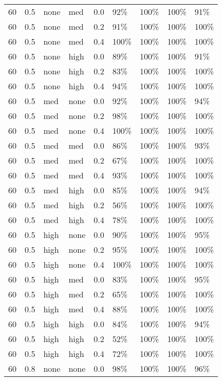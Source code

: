 \begin{longtable}{rrllrllll}
  60 & 0.5 & none & med & 0.0 & 92\% & 100\% & 100\% & 91\% \\ 
  60 & 0.5 & none & med & 0.2 & 91\% & 100\% & 100\% & 100\% \\ 
  60 & 0.5 & none & med & 0.4 & 100\% & 100\% & 100\% & 100\% \\ 
  60 & 0.5 & none & high & 0.0 & 89\% & 100\% & 100\% & 91\% \\ 
  60 & 0.5 & none & high & 0.2 & 83\% & 100\% & 100\% & 100\% \\ 
  60 & 0.5 & none & high & 0.4 & 94\% & 100\% & 100\% & 100\% \\ 
  60 & 0.5 & med & none & 0.0 & 92\% & 100\% & 100\% & 94\% \\ 
  60 & 0.5 & med & none & 0.2 & 98\% & 100\% & 100\% & 100\% \\ 
  60 & 0.5 & med & none & 0.4 & 100\% & 100\% & 100\% & 100\% \\ 
  60 & 0.5 & med & med & 0.0 & 86\% & 100\% & 100\% & 93\% \\ 
  60 & 0.5 & med & med & 0.2 & 67\% & 100\% & 100\% & 100\% \\ 
  60 & 0.5 & med & med & 0.4 & 93\% & 100\% & 100\% & 100\% \\ 
  60 & 0.5 & med & high & 0.0 & 85\% & 100\% & 100\% & 94\% \\ 
  60 & 0.5 & med & high & 0.2 & 56\% & 100\% & 100\% & 100\% \\ 
  60 & 0.5 & med & high & 0.4 & 78\% & 100\% & 100\% & 100\% \\ 
  60 & 0.5 & high & none & 0.0 & 90\% & 100\% & 100\% & 95\% \\ 
  60 & 0.5 & high & none & 0.2 & 95\% & 100\% & 100\% & 100\% \\ 
  60 & 0.5 & high & none & 0.4 & 100\% & 100\% & 100\% & 100\% \\ 
  60 & 0.5 & high & med & 0.0 & 83\% & 100\% & 100\% & 95\% \\ 
  60 & 0.5 & high & med & 0.2 & 65\% & 100\% & 100\% & 100\% \\ 
  60 & 0.5 & high & med & 0.4 & 88\% & 100\% & 100\% & 100\% \\ 
  60 & 0.5 & high & high & 0.0 & 84\% & 100\% & 100\% & 94\% \\ 
  60 & 0.5 & high & high & 0.2 & 52\% & 100\% & 100\% & 100\% \\ 
  60 & 0.5 & high & high & 0.4 & 72\% & 100\% & 100\% & 100\% \\ 
  60 & 0.8 & none & none & 0.0 & 98\% & 100\% & 100\% & 96\% \\ 

\end{longtable}
